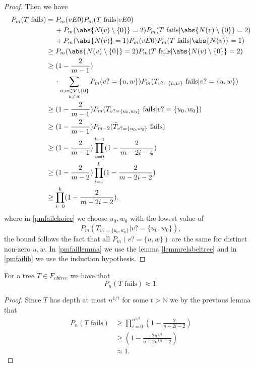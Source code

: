 \begin{proof}
Then we have
\begin{align}
P_m(\text{$T$ fails})&=P_m(vE0)P_m(\text{$T$ fails}|vE0)\\
&\:\phantom{=}\:+P_m(\abs{N(v)\setminus\{0\}}=2)P_m(\text{$T$ fails}|\abs{N(v)\setminus\{0\}}=2)\\
&\:\phantom{=}\:+P_m(\abs{N(v)}=1)P_m(vE0)P_m(\text{$T$ fails}|\abs{N(v)}=1)\\
&\geq P_m(\abs{N(v)\setminus\{0\}}=2)P_m(\text{$T$ fails}|\abs{N(v)\setminus\{0\}}=2)\\
&\geq (1-\frac{2}{m-1})\\
&\:\phantom{=}\:\cdot\sum_{\substack{u,w\in V\setminus \{0\} \\ u\not= w}}P_m(v?=\{u,w\})P_m(T_{v?=\{u,w\}}\text{ fails}|v?=\{u,w\})\\
&\geq(1-\frac{2}{m-1})P_m(T_{v?=\{u_0,w_0\}}\text{ fails}|v?=\{u_0,w_0\})\label{pmfailchoice}\\
&\geq(1-\frac{2}{m-1})P_{m-2}(\tilde T_{v?=\{u_0,w_0\}}\text{ fails})\label{pmfaillemma}\\
&\geq(1-\frac{2}{m-1})\prod_{i=0}^{k-1}(1-\frac{2}{m-2i-4})\label{pmfailih}\\
&\geq(1-\frac{2}{m-2})\prod_{i=1}^{k}(1-\frac{2}{m-2i-2})\\
&\geq\prod_{i=0}^{k}(1-\frac{2}{m-2i-2}).
\end{align}
where in \eqref{pmfailchoice} we choose $u_0,w_0$ with the lowest value of \[P_m(\text{$T_{v?=\{u_0,w_0\}}|v?=\{u_0,w_0\}$}),\] the bound follows the fact that all $P_m(v?=\{u,w\})$ are the same for distinct non-zero $u,w$. In \eqref{pmfaillemma} we use the lemma \ref{lemmrelabeltree} and in \eqref{pmfailih} we use the induction hypothesis.
\end{proof}

\begin{crll}\label{crllpPathtreefail}
For a tree $T\in F_{nbtree}$ we have that
\[P_n(T\text{ fails})\approx 1.\]
\end{crll}
\begin{proof}
Since $T$ has depth at most $n^{1/t}$ for some $t>\mathbb{N}$ we by the previous lemma that
\begin{align}
P_n(\text{$T$ fails})&\geq \prod_{i=0}^{n^{1/t}}\left(1-\frac{2}{n-2i-2}\right)\\
&\geq \left(1-\frac{2n^{1/t}}{n-2n^{1/t}-2}\right)\\
&\approx 1.
\end{align}
\end{proof}

